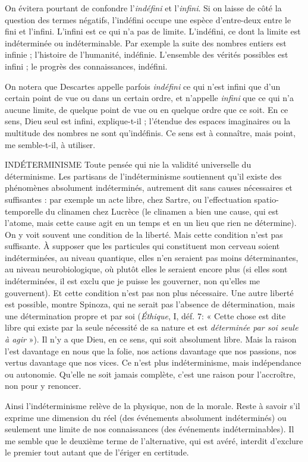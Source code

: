 On évitera pourtant de confondre l’{\it indéfini} et l'{\it infini}. Si on laisse de côté
la question des termes négatifs, l’indéfini occupe une espèce d’entre-deux entre
le fini et l'infini. L’infini est ce qui n’a pas de limite. L’indéfini, ce dont la
limite est indéterminée ou indéterminable. Par exemple la suite des nombres
entiers est infinie ; l’histoire de l'humanité, indéfinie. L'ensemble des vérités
possibles est infini ; le progrès des connaissances, indéfini.

On notera que Descartes appelle parfois {\it indéfini} ce qui n’est infini que
d’un certain point de vue ou dans un certain ordre, et n’appelle {\it infini} que ce
qui n’a aucune limite, de quelque point de vue ou en quelque ordre que ce soit.
En ce sens, Dieu seul est infini, explique-t-il ; l’étendue des espaces imaginaires
ou la multitude des nombres ne sont qu’indéfinis. Ce sens est à connaître, mais
point, me semble-t-il, à utiliser.

INDÉTERMINISME Toute pensée qui nie la validité universelle du déterminisme.
Les partisans de l’indéterminisme soutiennent
qu’il existe des phénomènes absolument indéterminés, autrement dit sans
causes nécessaires et suffisantes : par exemple un acte libre, chez Sartre, ou
l’effectuation spatio-temporelle du clinamen chez Lucrèce (le clinamen a bien
une cause, qui est l’atome, mais cette cause agit en un temps et en un lieu que
rien ne détermine). On y voit souvent une condition de la liberté. Mais cette
condition n’est pas suffisante. À supposer que les particules qui constituent
mon cerveau soient indéterminées, au niveau quantique, elles n’en seraient pas
moins déterminantes, au niveau neurobiologique, où plutôt elles le seraient
encore plus (si elles sont indéterminées, il est exclu que je puisse les gouverner,
non qu’elles me gouvernent). Et cette condition n’est pas non plus nécessaire.
Une autre liberté est possible, montre Spinoza, qui ne serait pas l’absence de
détermination, mais une détermination propre et par soi ({\it Éthique}, I, déf. 7:
« Cette chose est dite libre qui existe par la seule nécessité de sa nature et est
{\it déterminée par soi seule à agir} »). Il n’y a que Dieu, en ce sens, qui soit absolument
libre. Mais la raison l’est davantage en nous que la folie, nos actions
davantage que nos passions, nos vertus davantage que nos vices. Ce n’est plus
indéterminisme, mais indépendance ou autonomie. Qu'elle ne soit jamais
complète, c’est une raison pour l’accroître, non pour y renoncer.

Ainsi l’indéterminisme relève de la physique, non de la morale. Reste à
savoir s’il exprime une dimension du réel (des événements absolument indéterminés)
ou seulement une limite de nos connaissances (des événements indéterminables).
Il me semble que le deuxième terme de l’alternative, qui est avéré,
interdit d’exclure le premier tout autant que de l’ériger en certitude.

